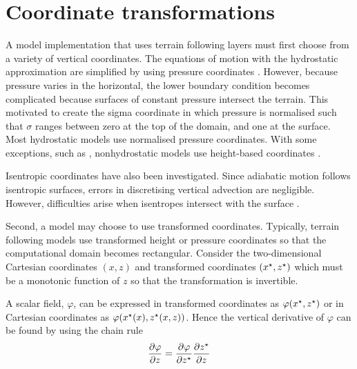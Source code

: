 \section{Coordinate transformations}
\label{sec:theory:coord-transform}

A model implementation that uses terrain following layers must first choose from a variety of vertical coordinates.  The equations of motion with the hydrostatic approximation are simplified by using pressure coordinates \autocite{eliassen1949}.  However, because pressure varies in the horizontal, the lower boundary condition becomes complicated because surfaces of constant pressure intersect the terrain.  This motivated \textcite{phillips1957} to create the sigma coordinate in which pressure is normalised such that $\sigma$ ranges between zero at the top of the domain, and one at the surface.
Most hydrostatic models use normalised pressure coordinates.  With some exceptions, such as \textcite{xue-thorpe1991}, nonhydrostatic models use height-based coordinates \autocite{steppeler2003}.

Isentropic coordinates have also been investigated.  Since adiabatic motion follows isentropic surfaces, errors in discretising vertical advection are negligible.  However, difficulties arise when isentropes intersect with the surface \autocite{konor-arakawa1997}.

Second, a model may choose to use transformed coordinates.  Typically, terrain following models use transformed height or pressure coordinates so that the computational domain becomes rectangular.
Consider the two-dimensional Cartesian coordinates $(x, z)$ and transformed coordinates $({x^\star}, {z^\star})$ which must be a monotonic function of $z$ so that the transformation is invertible.

A scalar field, $\varphi$, can be expressed in transformed coordinates as $\varphi({x^\star}, {z^\star})$ or in Cartesian coordinates as $\varphi({x^\star}(x), {z^\star}(x, z))$.
Hence the vertical derivative of $\varphi$ can be found by using the chain rule \autocite{mit2004}
\begin{align}
  \frac{\partial \varphi}{\partial z} =
  \frac{\partial \varphi}{\partial {z^\star}}
  \frac{\partial {z^\star}}{\partial z} \label{eqn:theory:grad-transform}
\end{align}

